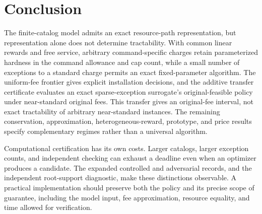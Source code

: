 \documentclass[11pt,letterpaper]{article}
\theoremstyle{definition}\newtheorem{remark}[theorem]{Remark}
\begin{document}
\section{Conclusion}\label{sec:conclusion63}
The finite-catalog model admits an exact resource-path representation, but representation alone does not determine tractability. With common linear rewards and free service, arbitrary command-specific charges retain parameterized hardness in the command allowance and cap count, while a small number of exceptions to a standard charge permits an exact fixed-parameter algorithm. The uniform-fee frontier gives explicit installation decisions, and the additive transfer certificate evaluates an exact sparse-exception surrogate's original-feasible policy under near-standard original fees. This transfer gives an original-fee interval, not exact tractability of arbitrary near-standard instances. The remaining conservation, approximation, heterogeneous-reward, prototype, and price results specify complementary regimes rather than a universal algorithm.

Computational certification has its own costs. Larger catalogs, larger exception counts, and independent checking can exhaust a deadline even when an optimizer produces a candidate. The expanded controlled and adversarial records, and the independent root-support diagnostic, make these distinctions observable. A practical implementation should preserve both the policy and its precise scope of guarantee, including the model input, fee approximation, resource equality, and time allowed for verification.
\end{document}
